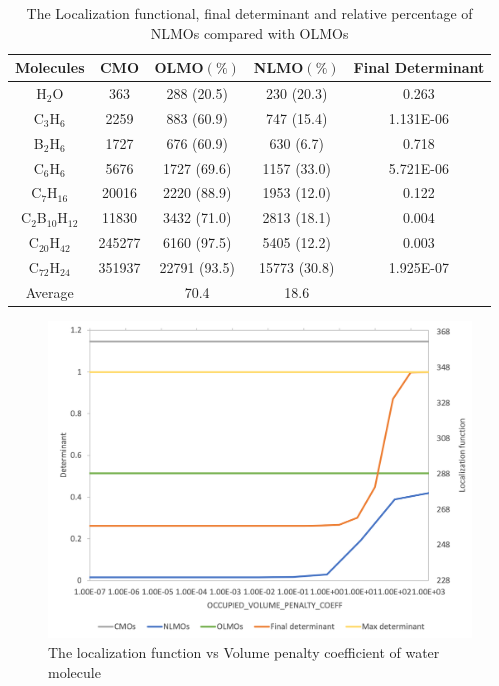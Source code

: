 \documentclass[aps,prl,reprint,amsmath,amssymb]{revtex4-1}
\begin{document}
\begin{table}[ht]
\caption{The Localization functional, final determinant and relative percentage of NLMOs compared with OLMOs}
\centering
\begin{tabular}{c c c c c}
\hline\hline
Molecules & CMO &  OLMO$(\%)$ & NLMO$(\%)$ & Final Determinant \\
\hline
H$_2$O& 363 & 288 (20.5) & 230 (20.3) & 0.263 \\ 
C$_3$H$_6$ & 2259 & 883 (60.9) & 747 (15.4) & 1.131E-06 \\ 
B$_2$H$_6$ & 1727 & 676 (60.9) & 630 (6.7) & 0.718 \\ 
C$_6$H$_6$  & 5676 & 1727 (69.6) & 1157 (33.0) & 5.721E-06 \\ 
C$_7$H$_{16}$ & 20016 & 2220 (88.9) & 1953 (12.0) & 0.122 \\ 
C$_2$B$_{10}$H$_{12}$ & 11830 & 3432 (71.0) & 2813 (18.1) & 0.004 \\ 
C$_{20}$H$_{42}$ & 245277 & 6160 (97.5) & 5405 (12.2) & 0.003 \\ 
C$_{72}$H$_{24}$ & 351937 & 22791 (93.5) & 15773 (30.8) & 1.925E-07 \\ 
Average & & 70.4 & 18.6 & \\
\hline
\end{tabular}
\label{table:nonlin}
\end{table}

\begin{figure}[htbp]
\includegraphics[scale=0.5]{water.png} 
  \caption{The localization function vs Volume penalty coefficient of water molecule}
\end{figure}
\end{document}
